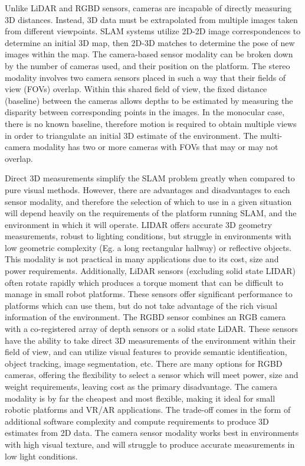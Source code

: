 Unlike LiDAR and RGBD sensors, cameras are incapable of directly measuring 3D distances. Instead, 3D data must be extrapolated from multiple images taken from different viewpoints. SLAM systems utilize 2D-2D image correspondences to determine an initial 3D map, then 2D-3D matches to determine the pose of new images within the map. The camera-based sensor modality can be broken down by the number of cameras used, and their position on the platform. The stereo modality involves two camera sensors placed in such a way that their fields of view (FOVs) overlap. Within this shared field of view, the fixed distance (baseline) between the cameras allows depths to be estimated by measuring the disparity between corresponding points in the images. In the monocular case, there is no known baseline, therefore motion is required to obtain multiple views in order to triangulate an initial 3D estimate of the environment. The multi-camera modality has two or more cameras with FOVs that may or may not overlap.

Direct 3D measurements simplify the SLAM problem greatly when compared to pure visual methods. However, there are advantages and disadvantages to each sensor modality, and therefore the selection of which to use in a given situation will depend heavily on the requirements of the platform running SLAM, and the environment in which it will operate. LIDAR offers accurate 3D geometry measurements, robust to lighting conditions, but struggle in environments with low geometric complexity (Eg. a long rectangular hallway) or reflective objects. This modality is not practical in many applications due to its cost, size and power requirements. Additionally, LiDAR sensors (excluding solid state LIDAR) often rotate rapidly which produces a torque moment that can be difficult to manage in small robot platforms. These sensors offer significant performance to platforms which can use them, but do not take advantage of the rich visual information of the environment. The RGBD sensor combines an RGB camera with a co-registered array of depth sensors or a solid state LiDAR. These sensors have the ability to take direct 3D measurements of the environment within their field of view, and can utilize visual features to provide semantic identification, object tracking, image segmentation, etc. There are many options for RGBD cameras, offering the flexibility to select a sensor which will meet power, size and weight requirements, leaving cost as the primary disadvantage. The camera modality is by far the cheapest and most flexible, making it ideal for small robotic platforms and VR/AR applications. The trade-off comes in the form of additional software complexity and compute requirements to produce 3D estimates from 2D data. The camera sensor modality works best in environments with high visual texture, and will struggle to produce accurate measurements in low light conditions.



